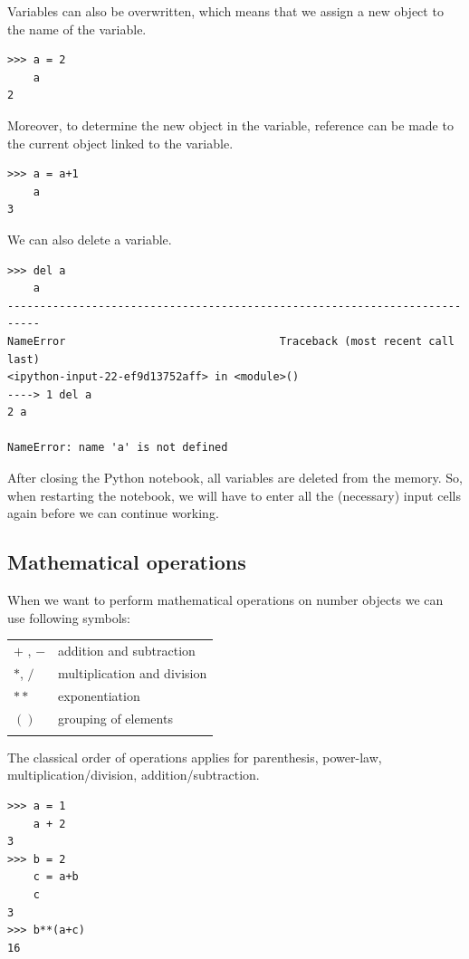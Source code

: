 Variables can also be overwritten, which means that we assign a new object to the name of the variable.

\begin{lstlisting}[]
>>> a = 2
    a
2
\end{lstlisting}

Moreover, to determine the new object in the variable, reference can be made to the current object linked to the variable.

\begin{lstlisting}[]
>>> a = a+1
    a
3
\end{lstlisting}

We can also delete a variable.
\begin{lstlisting}[]
>>> del a
    a
---------------------------------------------------------------------------
NameError                                 Traceback (most recent call last)
<ipython-input-22-ef9d13752aff> in <module>()
----> 1 del a
2 a

NameError: name 'a' is not defined
\end{lstlisting}

After closing the Python notebook, all variables are deleted from the memory. So, when restarting the notebook, we will have to enter all the (necessary) input cells again before we can continue working.

\subsection{Mathematical operations}
When we want to perform mathematical operations on number objects we can use following symbols:

\begin{tabular}{>{\hfill}p{5cm}p{12cm}}
	$+$ , $-$	&  addition and subtraction	\\
	$*$, $/$	& multiplication and division	\\
	$**$	& exponentiation	\\
	$()$	& grouping of elements	\\
	\multicolumn{2}{l}{} 
\end{tabular}

The classical order of operations applies for parenthesis, power-law, multiplication/division, addition/subtraction.

\begin{lstlisting}[]
>>> a = 1
    a + 2
3
>>> b = 2
    c = a+b
    c
3    
>>> b**(a+c)
16
\end{lstlisting}


